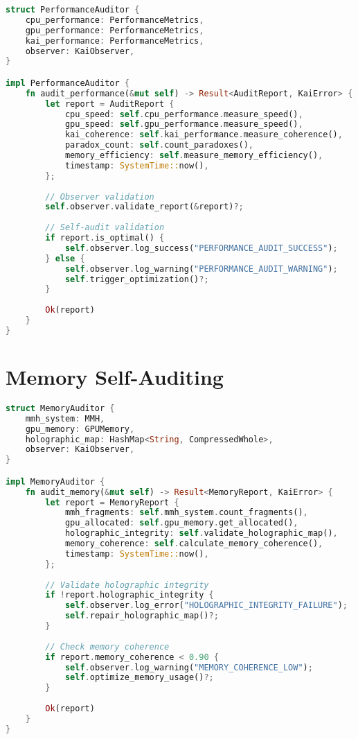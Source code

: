 \documentclass[11pt]{report}
\newcommand{\codebox}[2]{
  \begin{tcolorbox}[
    colback=gray!5,
    colframe=kai_blue,
    title=#1,
    fonttitle=\bfseries
  ]
  #2
  \end{tcolorbox}
}
\begin{document}
\codebox{Performance Monitoring}{
\begin{lstlisting}[language=rust]
struct PerformanceAuditor {
    cpu_performance: PerformanceMetrics,
    gpu_performance: PerformanceMetrics,
    kai_performance: PerformanceMetrics,
    observer: KaiObserver,
}

impl PerformanceAuditor {
    fn audit_performance(&mut self) -> Result<AuditReport, KaiError> {
        let report = AuditReport {
            cpu_speed: self.cpu_performance.measure_speed(),
            gpu_speed: self.gpu_performance.measure_speed(),
            kai_coherence: self.kai_performance.measure_coherence(),
            paradox_count: self.count_paradoxes(),
            memory_efficiency: self.measure_memory_efficiency(),
            timestamp: SystemTime::now(),
        };
        
        // Observer validation
        self.observer.validate_report(&report)?;
        
        // Self-audit validation
        if report.is_optimal() {
            self.observer.log_success("PERFORMANCE_AUDIT_SUCCESS");
        } else {
            self.observer.log_warning("PERFORMANCE_AUDIT_WARNING");
            self.trigger_optimization()?;
        }
        
        Ok(report)
    }
}
\end{lstlisting}
}

\section{Memory Self-Auditing}

\codebox{Memory Validation}{
\begin{lstlisting}[language=rust]
struct MemoryAuditor {
    mmh_system: MMH,
    gpu_memory: GPUMemory,
    holographic_map: HashMap<String, CompressedWhole>,
    observer: KaiObserver,
}

impl MemoryAuditor {
    fn audit_memory(&mut self) -> Result<MemoryReport, KaiError> {
        let report = MemoryReport {
            mmh_fragments: self.mmh_system.count_fragments(),
            gpu_allocated: self.gpu_memory.get_allocated(),
            holographic_integrity: self.validate_holographic_map(),
            memory_coherence: self.calculate_memory_coherence(),
            timestamp: SystemTime::now(),
        };
        
        // Validate holographic integrity
        if !report.holographic_integrity {
            self.observer.log_error("HOLOGRAPHIC_INTEGRITY_FAILURE");
            self.repair_holographic_map()?;
        }
        
        // Check memory coherence
        if report.memory_coherence < 0.90 {
            self.observer.log_warning("MEMORY_COHERENCE_LOW");
            self.optimize_memory_usage()?;
        }
        
        Ok(report)
    }
}
\end{lstlisting}
}
\end{document}
